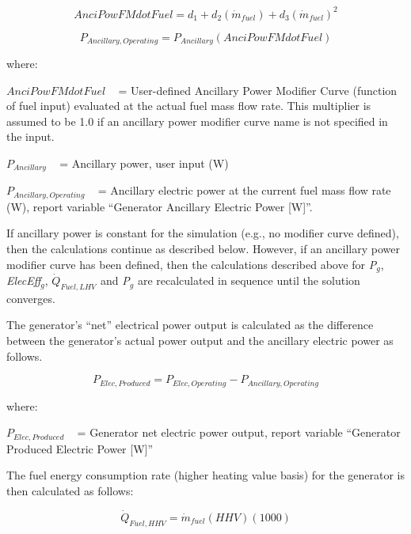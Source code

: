 \begin{equation}
AnciPowFMdotFuel = {d_1} + {d_2}\left( {{{\dot m}_{fuel}}} \right) + {d_3}{\left( {{{\dot m}_{fuel}}} \right)^2}
\end{equation}

\begin{equation}
{P_{Ancillary,Operating}} = {P_{Ancillary}}\left( {AnciPowFMdotFuel} \right)
\end{equation}

where:

\(AnciPowFMdotFuel\) ~ = User-defined Ancillary Power Modifier Curve (function of fuel input) evaluated at the actual fuel mass flow rate. This multiplier is assumed to be 1.0 if an ancillary power modifier curve name is not specified in the input.

\({P_{Ancillary}}\) ~ = Ancillary power, user input (W)

\({P_{Ancillary,Operating}}\) ~ = Ancillary electric power at the current fuel mass flow rate (W), report variable ``Generator Ancillary Electric Power {[}W{]}''.

If ancillary power is constant for the simulation (e.g., no modifier curve defined), then the calculations continue as described below. However, if an ancillary power modifier curve has been defined, then the calculations described above for \emph{P\(_{g}\)}, \emph{ElecEff\(_{g}\)}, \({\dot Q_{Fuel,LHV}}\) \(_{ }\)and \emph{P\(_{g}\)} are recalculated in sequence until the solution converges.

The generator's ``net'' electrical power output is calculated as the difference between the generator's actual power output and the ancillary electric power as follows.

\begin{equation}
{P_{Elec,Produced}} = {P_{Elec,Operating}} - {P_{Ancillary,Operating}}
\end{equation}

where:

\({P_{Elec,Produced}}\) ~ = Generator net electric power output, report variable ``Generator Produced Electric Power {[}W{]}''

The fuel energy consumption rate (higher heating value basis) for the generator is then calculated as follows:

\begin{equation}
{\dot Q_{Fuel,HHV}} = {\dot m_{fuel}}\left( {HHV} \right)\left( {1000} \right)
\end{equation}

